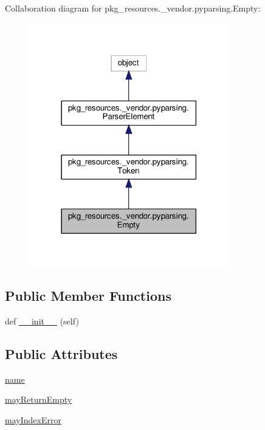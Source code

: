 Collaboration diagram for pkg\+\_\+resources.\+\_\+vendor.\+pyparsing.\+Empty\+:
\nopagebreak
\begin{figure}[H]
\begin{center}
\leavevmode
\includegraphics[width=246pt]{classpkg__resources_1_1__vendor_1_1pyparsing_1_1Empty__coll__graph}
\end{center}
\end{figure}
\subsection*{Public Member Functions}
\begin{DoxyCompactItemize}
\item 
def \hyperlink{classpkg__resources_1_1__vendor_1_1pyparsing_1_1Empty_a3d686c99c26f05ed5af85c7324b570d7}{\+\_\+\+\_\+init\+\_\+\+\_\+} (self)
\end{DoxyCompactItemize}
\subsection*{Public Attributes}
\begin{DoxyCompactItemize}
\item 
\hyperlink{classpkg__resources_1_1__vendor_1_1pyparsing_1_1Empty_a4bd532ed91e03e2c54746cb9cb8f9566}{name}
\item 
\hyperlink{classpkg__resources_1_1__vendor_1_1pyparsing_1_1Empty_a42abb4486528f19ecf0b5956a12376c6}{may\+Return\+Empty}
\item 
\hyperlink{classpkg__resources_1_1__vendor_1_1pyparsing_1_1Empty_af5269f1102be1d4866db7765843d4b86}{may\+Index\+Error}
\end{DoxyCompactItemize}
